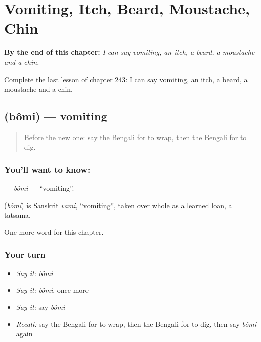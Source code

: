 
\chapter{Vomiting, Itch, Beard, Moustache, Chin}
\label{ch:bn-vomiting-itch-beard-moustache-chin}

\begin{chapteropening}
\textbf{By the end of this chapter:} \emph{I can say vomiting, an itch, a beard, a moustache and a chin.}

Complete the last lesson of chapter 243: I can say vomiting, an itch, a beard, a moustache and a chin.
\end{chapteropening}

\section[\texorpdfstring{\bn{বমি} (bômi)}{বমি (bômi)}]{ (bômi) — vomiting}

\label{lesson:BN-C243-bomi}



\begin{quote}
Before the new one: say the Bengali for to wrap, then the Bengali for to dig.
\end{quote}

\subsection*{You'll want to know: }
\textbf{} — \emph{bômi} — \textquotedblleft{}vomiting\textquotedblright{}.

\begin{cousinweb}
\textbf{} (\emph{bômi}) is Sanskrit \emph{vami}, \textquotedblleft{}vomiting\textquotedblright{}, taken over whole as a learned loan, a tatsama.
\end{cousinweb}

\begin{grammarlens}[title={What you've built}]
One more word for this chapter.
\end{grammarlens}

\subsection*{Your turn}
\begin{itemize}
\raggedright
  \item \emph{Say it:} \emph{bômi}
  \item \emph{Say it:} \emph{bômi}, once more
  \item \emph{Say it:} say \emph{bômi}
  \item \emph{Recall:} say the Bengali for to wrap, then the Bengali for to dig, then say \emph{bômi} again
\end{itemize}

